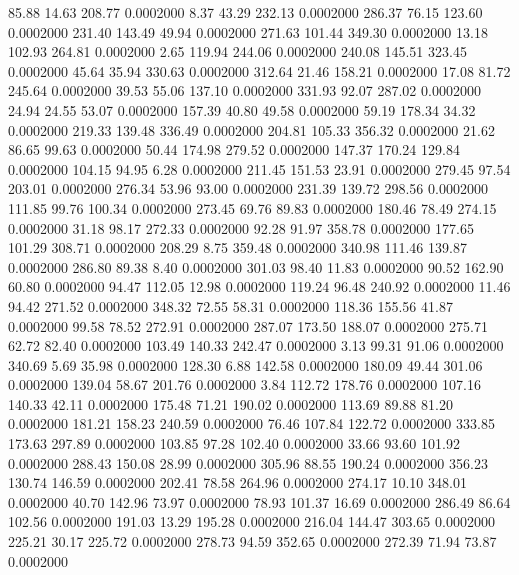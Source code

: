   85.88   14.63  208.77   0.0002000
   8.37   43.29  232.13   0.0002000
 286.37   76.15  123.60   0.0002000
 231.40  143.49   49.94   0.0002000
 271.63  101.44  349.30   0.0002000
  13.18  102.93  264.81   0.0002000
   2.65  119.94  244.06   0.0002000
 240.08  145.51  323.45   0.0002000
  45.64   35.94  330.63   0.0002000
 312.64   21.46  158.21   0.0002000
  17.08   81.72  245.64   0.0002000
  39.53   55.06  137.10   0.0002000
 331.93   92.07  287.02   0.0002000
  24.94   24.55   53.07   0.0002000
 157.39   40.80   49.58   0.0002000
  59.19  178.34   34.32   0.0002000
 219.33  139.48  336.49   0.0002000
 204.81  105.33  356.32   0.0002000
  21.62   86.65   99.63   0.0002000
  50.44  174.98  279.52   0.0002000
 147.37  170.24  129.84   0.0002000
 104.15   94.95    6.28   0.0002000
 211.45  151.53   23.91   0.0002000
 279.45   97.54  203.01   0.0002000
 276.34   53.96   93.00   0.0002000
 231.39  139.72  298.56   0.0002000
 111.85   99.76  100.34   0.0002000
 273.45   69.76   89.83   0.0002000
 180.46   78.49  274.15   0.0002000
  31.18   98.17  272.33   0.0002000
  92.28   91.97  358.78   0.0002000
 177.65  101.29  308.71   0.0002000
 208.29    8.75  359.48   0.0002000
 340.98  111.46  139.87   0.0002000
 286.80   89.38    8.40   0.0002000
 301.03   98.40   11.83   0.0002000
  90.52  162.90   60.80   0.0002000
  94.47  112.05   12.98   0.0002000
 119.24   96.48  240.92   0.0002000
  11.46   94.42  271.52   0.0002000
 348.32   72.55   58.31   0.0002000
 118.36  155.56   41.87   0.0002000
  99.58   78.52  272.91   0.0002000
 287.07  173.50  188.07   0.0002000
 275.71   62.72   82.40   0.0002000
 103.49  140.33  242.47   0.0002000
   3.13   99.31   91.06   0.0002000
 340.69    5.69   35.98   0.0002000
 128.30    6.88  142.58   0.0002000
 180.09   49.44  301.06   0.0002000
 139.04   58.67  201.76   0.0002000
   3.84  112.72  178.76   0.0002000
 107.16  140.33   42.11   0.0002000
 175.48   71.21  190.02   0.0002000
 113.69   89.88   81.20   0.0002000
 181.21  158.23  240.59   0.0002000
  76.46  107.84  122.72   0.0002000
 333.85  173.63  297.89   0.0002000
 103.85   97.28  102.40   0.0002000
  33.66   93.60  101.92   0.0002000
 288.43  150.08   28.99   0.0002000
 305.96   88.55  190.24   0.0002000
 356.23  130.74  146.59   0.0002000
 202.41   78.58  264.96   0.0002000
 274.17   10.10  348.01   0.0002000
  40.70  142.96   73.97   0.0002000
  78.93  101.37   16.69   0.0002000
 286.49   86.64  102.56   0.0002000
 191.03   13.29  195.28   0.0002000
 216.04  144.47  303.65   0.0002000
 225.21   30.17  225.72   0.0002000
 278.73   94.59  352.65   0.0002000
 272.39   71.94   73.87   0.0002000
